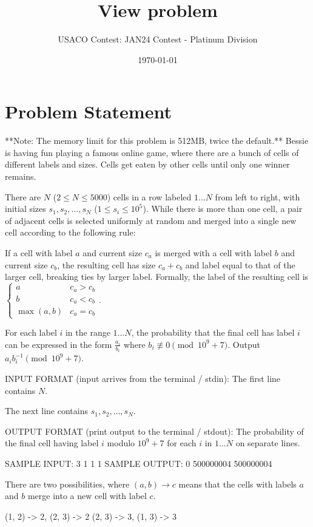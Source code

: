 \documentclass[12pt]{article}
\title{View problem}
\author{USACO Contest: JAN24 Contest - Platinum Division}
\date{\today}
\begin{document}
\maketitle

\section*{Problem Statement}


**Note: The memory limit for this problem is 512MB, twice the default.**
Bessie is having fun playing a famous online game, where there are a bunch of
cells of different labels and sizes. Cells get eaten by other cells until only
one winner remains.

There are $N$ ($2\le N\le 5000$) cells in a row labeled $1\dots N$ from left to
right, with initial sizes $s_1,s_2,\dots,s_N$ ($1\le s_i\le 10^5$). While there
is more than one cell, a pair of adjacent cells is selected uniformly at random
and merged into a single new cell according to the following rule: 

If a cell with label $a$ and current size $c_a$ is merged with a cell with label
$b$ and current size $c_b$, the resulting cell has size $c_a+c_b$ and label
equal to that of the larger cell, breaking ties by larger label. Formally, the
label of the resulting cell is
$\begin{cases}
a & c_a > c_b \\
b & c_a < c_b \\
\max(a,b) & c_a = c_b
\end{cases}.$

For each label $i$ in the range $1\dots N$, the probability that the final cell
has label $i$ can be expressed in the form $\frac{a_i}{b_i}$ where
$b_i\not\equiv 0\pmod{10^9+7}$. Output $a_ib_i^{-1}\pmod{10^9+7}$.

INPUT FORMAT (input arrives from the terminal / stdin):
The first line contains $N$.

The next line contains $s_1,s_2,\dots, s_N$.

OUTPUT FORMAT (print output to the terminal / stdout):
The probability of the final cell having label $i$ modulo $10^9+7$ for each $i$ in $1\dots N$ on
separate lines.

SAMPLE INPUT:
3
1 1 1
SAMPLE OUTPUT: 
0
500000004
500000004

There are two possibilities, where $(a,b)\to c$ means that the cells with labels
$a$ and $b$ merge into a new cell with label $c$.


(1, 2) -> 2, (2, 3) -> 2
(2, 3) -> 3, (1, 3) -> 3
\end{document}
